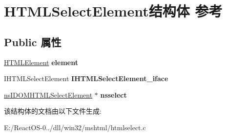 \hypertarget{struct_h_t_m_l_select_element}{}\section{H\+T\+M\+L\+Select\+Element结构体 参考}
\label{struct_h_t_m_l_select_element}
\subsection*{Public 属性}
\begin{DoxyCompactItemize}
\item 
\mbox{\label{struct_h_t_m_l_select_element_a753b7a47ab01b733f25e072f46d41750}} 
\hyperlink{struct_h_t_m_l_element}{H\+T\+M\+L\+Element} {\bfseries element}
\item 
\mbox{\label{struct_h_t_m_l_select_element_ac9ca14340ff98e2adaeef0de80cc1e42}} 
I\+H\+T\+M\+L\+Select\+Element {\bfseries I\+H\+T\+M\+L\+Select\+Element\+\_\+iface}
\item 
\mbox{\label{struct_h_t_m_l_select_element_a6af519f399a9bf2b52ff87270b9e6bab}} 
\hyperlink{interfacens_i_d_o_m_h_t_m_l_select_element}{ns\+I\+D\+O\+M\+H\+T\+M\+L\+Select\+Element} $\ast$ {\bfseries nsselect}
\end{DoxyCompactItemize}


该结构体的文档由以下文件生成\+:\begin{DoxyCompactItemize}
\item 
E\+:/\+React\+O\+S-\/0../dll/win32/mshtml/htmlselect.\+c\end{DoxyCompactItemize}
